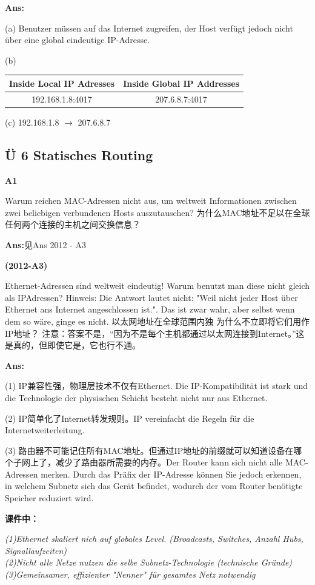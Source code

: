 \documentclass[fleqn]{article}
\begin{document}
\textbf{Ans:}

(a) Benutzer müssen auf das Internet zugreifen, der Host verfügt jedoch nicht über eine global eindeutige IP-Adresse.

(b) \begin{tabular}{|c|c|}
    \hline
    Inside Local IP Adresses & Inside Global IP Addresses\\
    \hline
    192.168.1.8:4017&207.6.8.7:4017\\
    \hline
\end{tabular}

(c) 192.168.1.8 $\rightarrow$ 207.6.8.7

\subsection{Ü 6 Statisches Routing}

\noindent\textbf{A1}

Warum reichen MAC-Adressen nicht aus, um weltweit Informationen zwischen zwei beliebigen verbundenen Hosts auszutauschen?
为什么MAC地址不足以在全球任何两个连接的主机之间交换信息？

\textbf{Ans:}见Ans 2012 - A3

\noindent\textbf{(2012-A3)} 

Ethernet-Adressen sind weltweit eindeutig! Warum benutzt man diese nicht gleich als IPAdressen?
Hinweis: Die Antwort lautet nicht: "Weil nicht jeder Host über Ethernet ans Internet angeschlossen ist.". Das ist zwar wahr, aber selbst wenn dem so wäre, ginge es nicht.
以太网地址在全球范围内独 为什么不立即将它们用作IP地址？
注意：答案不是，“因为不是每个主机都通过以太网连接到Internet。”这是真的，但即使它是，它也行不通。

\textbf{Ans:}

(1) IP兼容性强，物理层技术不仅有Ethernet. Die IP-Kompatibilität ist stark und die Technologie der physischen Schicht besteht nicht nur aus Ethernet.

(2) IP简单化了Internet转发规则。IP vereinfacht die Regeln für die Internetweiterleitung.

(3) 路由器不可能记住所有MAC地址。但通过IP地址的前缀就可以知道设备在哪个子网上了，减少了路由器所需要的内存。Der Router kann sich nicht alle MAC-Adressen merken. Durch das Präfix der IP-Adresse können Sie jedoch erkennen, in welchem ​​Subnetz sich das Gerät befindet, wodurch der vom Router benötigte Speicher reduziert wird.

\textbf{课件中：}

\textit{(1)Ethernet skaliert nich auf globales Level. (Broadcasts, Switches, Anzahl Hubs, Signallaufzeiten)\\\indent (2)Nicht alle Netze nutzen die selbe Subnetz-Technologie (technische Gründe)\\\indent (3)Gemeinsamer, effizienter "Nenner" für gesamtes Netz notwendig}
\end{document}
